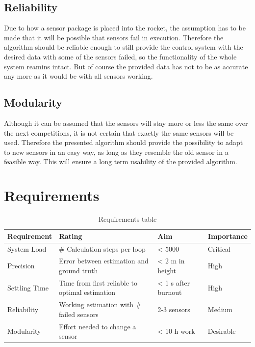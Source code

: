  \subsection{Reliability}
 Due to how a sensor package is placed into the rocket, the assumption has to be made that it will be possible that sensors fail in execution.
 Therefore the algorithm should be reliable enough to still provide the control system with the desired data with some of the sensors failed, so the functionality of the whole system reamins intact. But of course the provided data has not to be as accurate any more as it would be with all sensors working.

 \subsection{Modularity}
 Although it can be assumed that the sensors will stay more or less the same over the next competitions, it is not certain that exactly the same sensors will be used.
 Therefore the presented algorithm should provide the possibility to adapt to new sensors in an easy way, as long as they resemble the old sensor in a feasible way.
 This will ensure a long term usability of the provided algorithm.

 \newpage
 \section{Requirements}

 \begin{table}[h!]
 \centering
 \begin{tabular}{|l|l|l|l|}
 \hline
 \bf{Requirement}   & \bf{Rating} & \bf{Aim} & \bf{Importance} \\ \hline
 System Load   & \# Calculation steps per loop & < 5000 & Critical \\ \hline
 Precision     & Error between estimation and ground truth  & < 2 m in height & High  \\ \hline
 Settling Time & Time from first reliable to optimal estimation  & < 1 s after burnout &  High \\ \hline
 Reliability   & Working estimation with \# failed sensors & 2-3 sensors & Medium \\ \hline
 Modularity    & Effort needed to change a sensor & < 10 h work &  Desirable \\ \hline
 \end{tabular}
 \caption{Requirements table}
 \label{tab:Requirements}
 \end{table}

